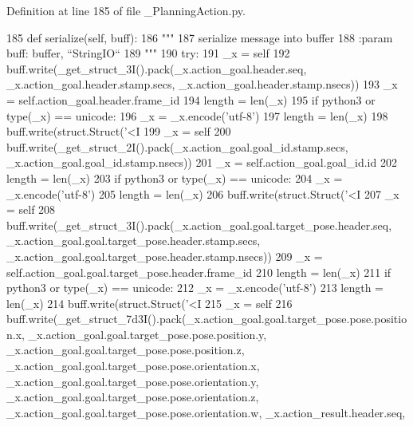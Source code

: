 Definition at line 185 of file \+\_\+\+Planning\+Action.\+py.


\begin{DoxyCode}
185   \textcolor{keyword}{def }serialize(self, buff):
186     \textcolor{stringliteral}{"""}
187 \textcolor{stringliteral}{    serialize message into buffer}
188 \textcolor{stringliteral}{    :param buff: buffer, ``StringIO``}
189 \textcolor{stringliteral}{    """}
190     \textcolor{keywordflow}{try}:
191       \_x = self
192       buff.write(\_get\_struct\_3I().pack(\_x.action\_goal.header.seq, \_x.action\_goal.header.stamp.secs, 
      \_x.action\_goal.header.stamp.nsecs))
193       \_x = self.action\_goal.header.frame\_id
194       length = len(\_x)
195       \textcolor{keywordflow}{if} python3 \textcolor{keywordflow}{or} type(\_x) == unicode:
196         \_x = \_x.encode(\textcolor{stringliteral}{'utf-8'})
197         length = len(\_x)
198       buff.write(struct.Struct(\textcolor{stringliteral}{'<I%
199       \_x = self
200       buff.write(\_get\_struct\_2I().pack(\_x.action\_goal.goal\_id.stamp.secs, 
      \_x.action\_goal.goal\_id.stamp.nsecs))
201       \_x = self.action\_goal.goal\_id.id
202       length = len(\_x)
203       \textcolor{keywordflow}{if} python3 \textcolor{keywordflow}{or} type(\_x) == unicode:
204         \_x = \_x.encode(\textcolor{stringliteral}{'utf-8'})
205         length = len(\_x)
206       buff.write(struct.Struct(\textcolor{stringliteral}{'<I%
207       \_x = self
208       buff.write(\_get\_struct\_3I().pack(\_x.action\_goal.goal.target\_pose.header.seq, 
      \_x.action\_goal.goal.target\_pose.header.stamp.secs, \_x.action\_goal.goal.target\_pose.header.stamp.nsecs))
209       \_x = self.action\_goal.goal.target\_pose.header.frame\_id
210       length = len(\_x)
211       \textcolor{keywordflow}{if} python3 \textcolor{keywordflow}{or} type(\_x) == unicode:
212         \_x = \_x.encode(\textcolor{stringliteral}{'utf-8'})
213         length = len(\_x)
214       buff.write(struct.Struct(\textcolor{stringliteral}{'<I%
215       \_x = self
216       buff.write(\_get\_struct\_7d3I().pack(\_x.action\_goal.goal.target\_pose.pose.position.x, 
      \_x.action\_goal.goal.target\_pose.pose.position.y, \_x.action\_goal.goal.target\_pose.pose.position.z, 
      \_x.action\_goal.goal.target\_pose.pose.orientation.x, \_x.action\_goal.goal.target\_pose.pose.orientation.y, 
      \_x.action\_goal.goal.target\_pose.pose.orientation.z, \_x.action\_goal.goal.target\_pose.pose.orientation.w, \_x.action\_result.header.seq, 
}}}
\end{DoxyCode}
